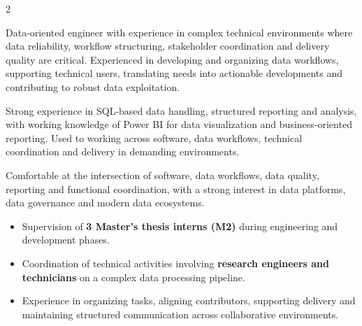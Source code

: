 \documentclass[8pt,a4paper,ragged2e,withhyper]{../_shared/altacv}
\begin{document}
\begin{paracol}{2}
\switchcolumn


Data-oriented engineer with experience in complex technical environments where data reliability, workflow structuring, stakeholder coordination and delivery quality are critical. Experienced in developing and organizing data workflows, supporting technical users, translating needs into actionable developments and contributing to robust data exploitation.

Strong experience in SQL-based data handling, structured reporting and analysis, with working knowledge of Power BI for data visualization and business-oriented reporting. Used to working across software, data workflows, technical coordination and delivery in demanding environments.

Comfortable at the intersection of software, data workflows, data quality, reporting and functional coordination, with a strong interest in data platforms, data governance and modern data ecosystems.


\begin{itemize}
  \item Supervision of \textbf{3 Master’s thesis interns (M2)} during engineering and development phases.
  \item Coordination of technical activities involving \textbf{research engineers and technicians} on a complex data processing pipeline.
  \item Experience in organizing tasks, aligning contributors, supporting delivery and maintaining structured communication across collaborative environments.
\end{itemize}

\divider
{}
\divider

\medskip

\divider

\divider

\divider



\end{paracol}
\end{document}
